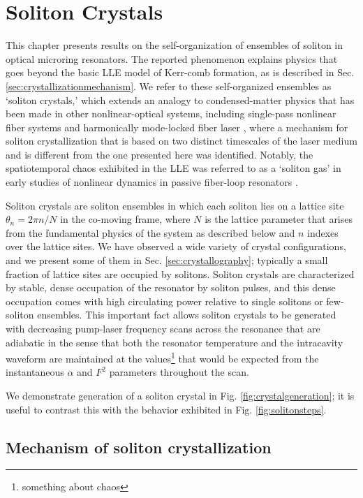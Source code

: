  \chapter{Soliton Crystals} \label{ch:SolitonCrystals}

This chapter presents results on the self-organization of ensembles of soliton in optical microring resonators. The reported phenomenon explains physics that goes beyond the basic LLE model of Kerr-comb formation, as is described in Sec. \ref{sec:crystallizationmechanism}. We refer to these self-organized ensembles as `soliton crystals,' which extends an analogy to condensed-matter physics that has been made in other nonlinear-optical systems, including single-pass nonlinear fiber systems \cite{23} and harmonically mode-locked fiber laser \cite{24-25}, where a mechanism for soliton crystallization that is based on two distinct timescales of the laser medium and is different from the one presented here was identified. Notably, the spatiotemporal chaos exhibited in the LLE was referred to as a `soliton gas' in early studies of nonlinear dynamics in passive fiber-loop resonators \cite{20-22}. 

Soliton crystals are soliton ensembles in which each soliton lies on a lattice site $\theta_n= 2\pi n/N$ in the co-moving frame, where $N$ is the lattice parameter that arises from the fundamental physics of the system as described below and $n$ indexes over the lattice sites. We have observed a wide variety of crystal configurations, and we present some of them in Sec. \ref{sec:crystallography}; typically a small fraction of lattice sites are occupied by solitons. Soliton crystals are characterized by stable, dense occupation of the resonator by soliton pulses, and this dense occupation comes with high circulating power relative to single solitons or few-soliton ensembles. This important fact allows soliton crystals to be generated with decreasing pump-laser frequency scans across the resonance that are adiabatic in the sense that both the resonator temperature and the intracavity waveform are maintained at the values\footnote{\color{red}something about chaos\color{black}} that would be expected from the instantaneous $\alpha$ and $F^2$ parameters throughout the scan.

We demonstrate generation of a soliton crystal in Fig. \ref{fig:crystalgeneration}; it is useful to contrast this with the behavior exhibited in Fig. \ref{fig:solitonsteps}. 

\section{Mechanism of soliton crystallization}

